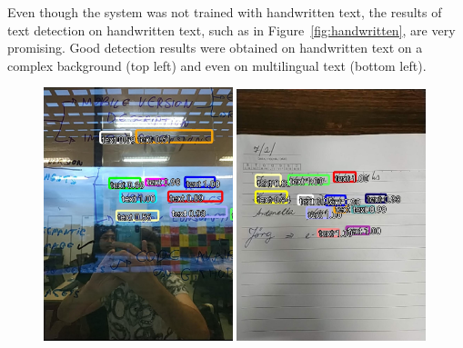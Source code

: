 Even though the system was not trained with handwritten text, the results of text detection on handwritten text, such as in Figure~\ref{fig:handwritten}, are very promising. Good detection results were obtained on handwritten text on a complex background (top left) and even on multilingual text (bottom left). 
\begin{figure}[h!]
\centering
\includegraphics[width=0.49\textwidth]{Mobile/images/app22.jpg}
\includegraphics[width=0.49\textwidth]{Mobile/images/app31.jpg}

\vspace{1.5mm}


\end{figure}

